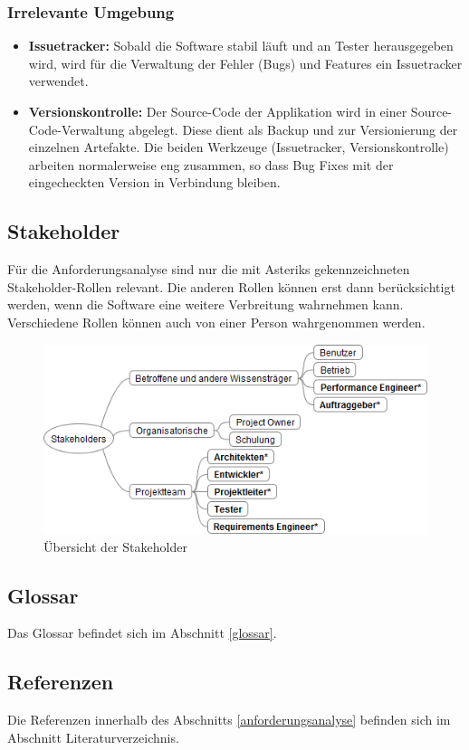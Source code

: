 \subsubsection{Irrelevante Umgebung}
\begin{itemize}
	\item \textbf{Issuetracker:} Sobald die Software stabil läuft und an Tester herausgegeben wird, wird für die Verwaltung der Fehler (Bugs) und Features ein Issuetracker verwendet.
	\item \textbf{Versionskontrolle:} Der Source-Code der Applikation wird in einer Source-Code-Verwaltung abgelegt. Diese dient als Backup und zur Versionierung der einzelnen Artefakte. Die beiden Werkzeuge (Issuetracker, Versionskontrolle) arbeiten normalerweise eng zusammen, so dass Bug Fixes mit der eingecheckten Version in Verbindung bleiben.
\end{itemize}


\subsection{Stakeholder}
Für die Anforderungsanalyse sind nur die mit Asteriks gekennzeichneten Stakeholder-Rollen relevant. Die anderen Rollen können erst dann berücksichtigt werden, wenn die Software eine weitere Verbreitung wahrnehmen kann. Verschiedene Rollen können auch von einer Person wahrgenommen werden. 
\begin{figure}[H]
  	\centering
    	\includegraphics[width=13cm]{images/stakeholder_analyse}
        	\caption{Übersicht der Stakeholder}
\end{figure}

\subsection{Glossar}
Das Glossar befindet sich im Abschnitt \ref{glossar}. 
\subsection{Referenzen}
Die Referenzen innerhalb des Abschnitts \ref{anforderungsanalyse} befinden sich im Abschnitt Literaturverzeichnis.
